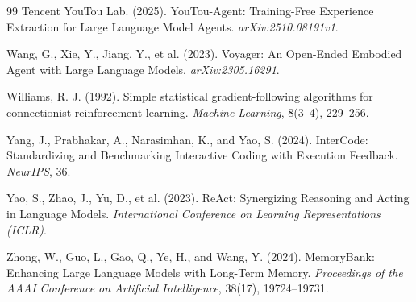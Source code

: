 \begin{thebibliography}{99}
Tencent YouTou Lab. (2025).
\newblock YouTou-Agent: Training-Free Experience Extraction for Large Language
  Model Agents.
\newblock \emph{arXiv:2510.08191v1}.

Wang, G., Xie, Y., Jiang, Y., et al. (2023).
\newblock Voyager: An Open-Ended Embodied Agent with Large Language Models.
\newblock \emph{arXiv:2305.16291}.

Williams, R. J. (1992).
\newblock Simple statistical gradient-following algorithms for connectionist
  reinforcement learning.
\newblock \emph{Machine Learning}, 8(3--4), 229--256.

Yang, J., Prabhakar, A., Narasimhan, K., and Yao, S. (2024).
\newblock InterCode: Standardizing and Benchmarking Interactive Coding with
  Execution Feedback.
\newblock \emph{NeurIPS}, 36.

Yao, S., Zhao, J., Yu, D., et al. (2023).
\newblock ReAct: Synergizing Reasoning and Acting in Language Models.
\newblock \emph{International Conference on Learning Representations (ICLR)}.

Zhong, W., Guo, L., Gao, Q., Ye, H., and Wang, Y. (2024).
\newblock MemoryBank: Enhancing Large Language Models with Long-Term Memory.
\newblock \emph{Proceedings of the AAAI Conference on Artificial Intelligence},
  38(17), 19724--19731.

\end{thebibliography}

